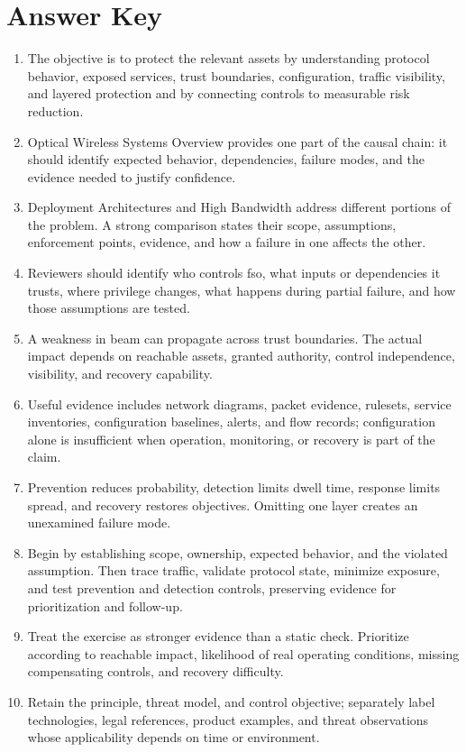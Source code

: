 \documentclass[11pt]{article}
\begin{document}
\section*{Answer Key}
\begin{enumerate}
\item The objective is to protect the relevant assets by understanding protocol behavior, exposed services, trust boundaries, configuration, traffic visibility, and layered protection and by connecting controls to measurable risk reduction.
\item Optical Wireless Systems Overview provides one part of the causal chain: it should identify expected behavior, dependencies, failure modes, and the evidence needed to justify confidence.
\item Deployment Architectures and High Bandwidth address different portions of the problem. A strong comparison states their scope, assumptions, enforcement points, evidence, and how a failure in one affects the other.
\item Reviewers should identify who controls fso, what inputs or dependencies it trusts, where privilege changes, what happens during partial failure, and how those assumptions are tested.
\item A weakness in beam can propagate across trust boundaries. The actual impact depends on reachable assets, granted authority, control independence, visibility, and recovery capability.
\item Useful evidence includes network diagrams, packet evidence, rulesets, service inventories, configuration baselines, alerts, and flow records; configuration alone is insufficient when operation, monitoring, or recovery is part of the claim.
\item Prevention reduces probability, detection limits dwell time, response limits spread, and recovery restores objectives. Omitting one layer creates an unexamined failure mode.
\item Begin by establishing scope, ownership, expected behavior, and the violated assumption. Then trace traffic, validate protocol state, minimize exposure, and test prevention and detection controls, preserving evidence for prioritization and follow-up.
\item Treat the exercise as stronger evidence than a static check. Prioritize according to reachable impact, likelihood of real operating conditions, missing compensating controls, and recovery difficulty.
\item Retain the principle, threat model, and control objective; separately label technologies, legal references, product examples, and threat observations whose applicability depends on time or environment.
\end{enumerate}
\end{document}

